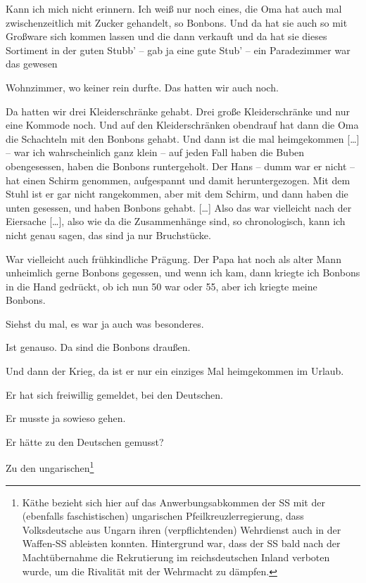 \documentclass[ngerman,]{article}
\providecommand{\tightlist}{%
  \setlength{\itemsep}{0pt}\setlength{\parskip}{0pt}}
\begin{document}
\begin{multicols}{3}
\begin{description}
\tightlist
\item[Käthe]
Kann ich mich nicht erinnern. Ich weiß nur noch eines, die Oma hat auch
mal zwischenzeitlich mit Zucker gehandelt, so Bonbons. Und da hat sie
auch so mit Großware sich kommen lassen und die dann verkauft und da hat
sie dieses Sortiment in der guten Stubb' – gab ja eine gute Stub' – ein
Paradezimmer war das gewesen
\item[Ruth]
Wohnzimmer, wo keiner rein durfte. Das hatten wir auch noch.
\item[Käthe]
Da hatten wir drei Kleiderschränke gehabt. Drei große Kleiderschränke
und nur eine Kommode noch. Und auf den Kleiderschränken obendrauf hat
dann die Oma die Schachteln mit den Bonbons gehabt. Und dann ist die mal
heimgekommen {[}\ldots{}{]} – war ich wahrscheinlich ganz klein – auf
jeden Fall haben die Buben obengesessen, haben die Bonbons runtergeholt.
Der Hans – dumm war er nicht – hat einen Schirm genommen, aufgespannt
und damit heruntergezogen. Mit dem Stuhl ist er gar nicht rangekommen,
aber mit dem Schirm, und dann haben die unten gesessen, und haben
Bonbons gehabt. {[}\ldots{}{]} Also das war vielleicht nach der
Eiersache {[}\ldots{}{]}, also wie da die Zusammenhänge sind, so
chronologisch, kann ich nicht genau sagen, das sind ja nur Bruchstücke.
\item[Ruth]
War vielleicht auch frühkindliche Prägung. Der Papa hat noch als alter
Mann unheimlich gerne Bonbons gegessen, und wenn ich kam, dann kriegte
ich Bonbons in die Hand gedrückt, ob ich nun 50 war oder 55, aber ich
kriegte meine Bonbons.
\item[Käthe]
Siehst du mal, es war ja auch was besonderes.
\item[Friedrich]
Ist genauso. Da sind die Bonbons draußen.
\item[Käthe]
Und dann der Krieg, da ist er nur ein einziges Mal heimgekommen im
Urlaub.
\item[Ruth]
Er hat sich freiwillig gemeldet, bei den Deutschen.
\item[Käthe]
Er musste ja sowieso gehen.
\item[Ruth]
Er hätte zu den Deutschen gemusst?
\item[Käthe]
Zu den ungarischen\footnote{Käthe bezieht sich hier auf das
  Anwerbungsabkommen der SS mit der (ebenfalls faschistischen)
  ungarischen Pfeilkreuzlerregierung, dass Volksdeutsche aus Ungarn
  ihren (verpflichtenden) Wehrdienst auch in der Waffen-SS ableisten
  konnten. Hintergrund war, dass der SS bald nach der Machtübernahme die
  Rekrutierung im reichsdeutschen Inland verboten wurde, um die
  Rivalität mit der Wehrmacht zu dämpfen.

}
\end{description}
\end{multicols}
\end{document}
